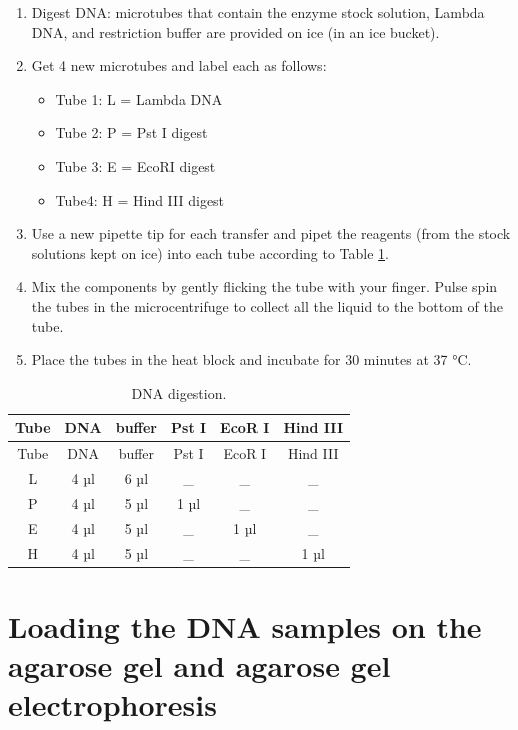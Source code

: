 \documentclass[]{book}
\providecommand{\tightlist}{%
  \setlength{\itemsep}{0pt}\setlength{\parskip}{0pt}}
\begin{document}
\begin{enumerate}
\def\labelenumi{\arabic{enumi}.}
\tightlist
\item
  Digest DNA: microtubes that contain the enzyme stock solution, Lambda DNA, and restriction buffer are provided on ice (in an ice bucket).
\item
  Get 4 new microtubes and label each as follows:

  \begin{itemize}
  \tightlist
  \item
    Tube 1: L = Lambda DNA
  \item
    Tube 2: P = Pst I digest
  \item
    Tube 3: E = EcoRI digest
  \item
    Tube4: H = Hind III digest
  \end{itemize}
\item
  Use a new pipette tip for each transfer and pipet the reagents (from the stock solutions kept on ice) into each tube according to Table \ref{tab:digest}.
\item
  Mix the components by gently flicking the tube with your finger. Pulse spin the tubes in the microcentrifuge to collect all the liquid to the bottom of the tube.
\item
  Place the tubes in the heat block and incubate for 30 minutes at 37 °C.
\end{enumerate}

\begin{longtable}[]{@{}cccccc@{}}
\caption{\label{tab:digest} DNA digestion.}\tabularnewline
\toprule
Tube & DNA & buffer & Pst I & EcoR I & Hind III\tabularnewline
\midrule
\endfirsthead
\toprule
Tube & DNA & buffer & Pst I & EcoR I & Hind III\tabularnewline
\midrule
\endhead
L & 4 µl & 6 µl & \_ & \_ & \_\tabularnewline
P & 4 µl & 5 µl & 1 µl & \_ & \_\tabularnewline
E & 4 µl & 5 µl & \_ & 1 µl & \_\tabularnewline
H & 4 µl & 5 µl & \_ & \_ & 1 µl\tabularnewline
\bottomrule
\end{longtable}

\hypertarget{loading-the-dna-samples-on-the-agarose-gel-and-agarose-gel-electrophoresis}{%
\section{Loading the DNA samples on the agarose gel and agarose gel electrophoresis}\label{loading-the-dna-samples-on-the-agarose-gel-and-agarose-gel-electrophoresis}}
\end{document}
